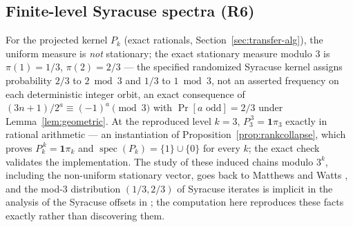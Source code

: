 \documentclass[11pt]{amsart}
\theoremstyle{definition}
\theoremstyle{remark}
\begin{document}
\subsection{Finite-level Syracuse spectra (R6)}\label{sec:results-spectral}
For the projected kernel $P_k$ (exact rationals, Section~\ref{sec:transfer-alg}), the uniform measure is \emph{not} stationary; the exact stationary measure modulo $3$ is $\pi(1) = 1/3$, $\pi(2) = 2/3$ --- the specified randomized Syracuse kernel assigns probability $2/3$ to $2 \bmod 3$ and $1/3$ to $1 \bmod 3$, not an asserted frequency on each deterministic integer orbit, an exact consequence of $(3n+1)/2^a \equiv (-1)^a \pmod 3$ with $\Pr[a \text{ odd}] = 2/3$ under Lemma~\ref{lem:geometric}. At the reproduced level $k=3$, $P_3^{\,3} = \mathbf{1}\pi_3$ exactly in rational arithmetic --- an instantiation of Proposition~\ref{prop:rankcollapse}, which proves $P_k^{\,k} = \mathbf{1}\pi_k$ and $\operatorname{spec}(P_k) = \{1\} \cup \{0\}$ for every $k$; the exact check validates the implementation. The study of these induced chains modulo $3^k$, including the non-uniform stationary vector, goes back to Matthews and Watts \cite{matthewswatts1984,matthewswatts1985}, and the mod-$3$ distribution $(1/3, 2/3)$ of Syracuse iterates is implicit in the analysis of the Syracuse offsets in \cite{tao2022}; the computation here reproduces these facts exactly rather than discovering them.
\end{document}
